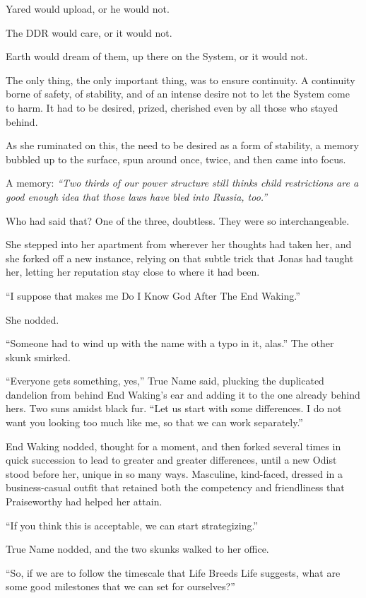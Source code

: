 Yared would upload, or he would not.

The DDR would care, or it would not.

Earth would dream of them, up there on the System, or it would not.

The only thing, the only important thing, was to ensure continuity. A continuity borne of safety, of stability, and of an intense desire not to let the System come to harm. It had to be desired, prized, cherished even by all those who stayed behind.

As she ruminated on this, the need to be desired as a form of stability, a memory bubbled up to the surface, spun around once, twice, and then came into focus.

A memory: \emph{``Two thirds of our power structure still thinks child restrictions are a good enough idea that those laws have bled into Russia, too.''}

Who had said that? One of the three, doubtless. They were so interchangeable.

She stepped into her apartment from wherever her thoughts had taken her, and she forked off a new instance, relying on that subtle trick that Jonas had taught her, letting her reputation stay close to where it had been.

``I suppose that makes me Do I Know God After The End Waking.''

She nodded.

``Someone had to wind up with the name with a typo in it, alas.'' The other skunk smirked.

``Everyone gets something, yes,'' True Name said, plucking the duplicated dandelion from behind End Waking's ear and adding it to the one already behind hers. Two suns amidst black fur. ``Let us start with some differences. I do not want you looking too much like me, so that we can work separately.''

End Waking nodded, thought for a moment, and then forked several times in quick succession to lead to greater and greater differences, until a new Odist stood before her, unique in so many ways. Masculine, kind-faced, dressed in a business-casual outfit that retained both the competency and friendliness that Praiseworthy had helped her attain.

``If you think this is acceptable, we can start strategizing.''

True Name nodded, and the two skunks walked to her office.

``So, if we are to follow the timescale that Life Breeds Life suggests, what are some good milestones that we can set for ourselves?''

